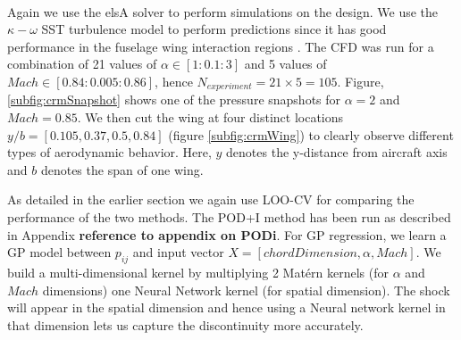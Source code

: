 Again we use the elsA\textsuperscript{\textregistered} solver to perform simulations on the design. We use the $\kappa - \omega$ SST turbulence model to perform predictions since it has good performance in the fuselage wing interaction regions \cite{menter2003ten, vassberg2014summary}. The CFD was run for a combination of 21 values of $\alpha \in [1: 0.1: 3]$ and 5 values of $Mach \in [0.84: 0.005: 0.86]$, hence $N_{experiment} = 21\times5 = 105$. Figure, \ref{subfig:crmSnapshot} shows one of the pressure snapshots for $\alpha = 2$ and $Mach = 0.85$. We then cut the wing at four distinct locations $y/b = [0.105, 0.37, 0.5, 0.84]$ (figure \ref{subfig:crmWing}) to clearly observe different types of aerodynamic behavior. Here, $y$ denotes the y-distance from aircraft axis and $b$ denotes the span of one wing. 

As detailed in the earlier section we again use LOO-CV for comparing the performance of the two methods. The POD+I method has been run as described in Appendix \textbf{reference to appendix on PODi}. For GP regression, we learn a GP model between $p_{ij}$ and input vector $X = [chordDimension, \alpha, Mach]$. We build a multi-dimensional kernel by multiplying 2 Mat\'ern kernels (for $\alpha$ and $Mach$ dimensions) one Neural Network kernel (for spatial dimension). The shock will appear in the spatial dimension and hence using a Neural network kernel in that dimension lets us capture the discontinuity more accurately. 

